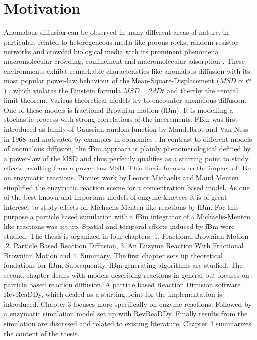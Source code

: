 \documentclass[
  a4paper,BCOR10mm,oneside,
  bibtotoc,idxtotoc,
  headsepline,footsepline,%
  fleqn,openbib
]{scrbook}
\begin{document}
\chapter*{Motivation}
Anomalous diffusion can be observed in many different areas of nature, in particular, related to heterogeneous media like porous rocks, random resistor networks and crowded biological media with its prominent phenomena macromolecular crowding, confinement and macromolecular adsorption \cite{Minton2006}. These environments exhibit remarkable characteristics like anomalous diffusion with its most popular power-law behaviour of the Mean-Square-Displacement ($MSD\propto t^{\alpha}$) \cite{Hofling2013}, which violates the Einstein formula $MSD=2 d D t$ and thereby the central limit theorem. Various theoretical models try to encounter anomalous diffusion. One of these models is fractional Brownian motion (fBm). It is modelling a stochastic process with strong correlations of the incerements. FBm was first introduced as family of Gaussian random function by Mandelbrot and Van Ness in 1968 and motivated by examples in economics \cite{Mandelbrot1968}. In contrast to different models of anomalous diffusion, the fBm approach is plainly phenomenological defined by a power-law of the MSD and thus perfectly qualifies as a starting point to study effects resulting from a power-law MSD. \newline This thesis focuses on the impact of fBm on enzymatic reactions. Pionier work by Leonor Michaelis and Maud Menten \cite{michaelis1913kinetik} simplified the enzymatic reaction sceme for a concentration based model. As one of the best known and important models of enzyme kinetecs it is of great intereset to study effects on Michaelis-Menten like reactions by fBm. For this purpose a particle based simulation with a fBm integrator of a Michaelis-Menten like reactions was set up. Spatial and temporal effects induced by fBm were studied. 
\newline The thesis is organized in four chapters: 1. Fractional Brownian Motion ,2. Particle Based Reaction Diffusion, 3. An Enzyme Reaction With Fractional Brownian Motion and 4. Summary. The first chapter sets up theoretical fondations for fBm. Subsequently, fBm generating algorithms are studied. The second chapter deales with models describing reactions in general but focuses on particle based reaction diffusion. A particle based Reaction Diffusion software RevReaDDy, which dealed as a starting point for the implementation is introduced.  Chapter 3 focuses more specifically on enzyme reactions. Followed by a enzymatic simulation model set up with RevReaDDy. Finally results from the simulation are discussed and related to existing literature. Chapter 4 summarizes the content of the thesis. 
\end{document}
